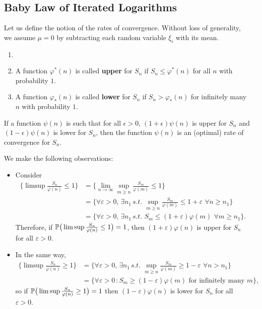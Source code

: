 \subsection{Baby Law of Iterated Logarithms}
Let us define the notion of the rates of convergence. Without loss of generality, we assume $\mu = 0$ by subtracting each random variable $\xi_i$ with its mean.
\begin{definition}
\begin{enumerate}
    \item[]
    \item A function $\varphi^*(n)$ is called \textbf{upper} for $S_n$ if $S_n \le \varphi^*(n)$ for all $n$ with probability $1$.
    \item A function $\varphi_*(n)$ is called \textbf{lower} for $S_n$ if $S_n > \varphi_*(n)$ for infinitely many $n$ with probability $1$.
\end{enumerate}

If a function $\psi(n)$ is such that for all $\epsilon > 0$, $(1+\epsilon)\psi(n)$ is upper for $S_n$ and $(1-\epsilon)\psi(n)$ is lower for $S_n$, then the function $\psi(n)$ is an (optimal) rate of convergence for $S_n$.
\end{definition}

We make the following observations:
\begin{itemize}
\item Consider
\begin{align*}
    \bigg\{ \limsup \frac{S_n}{\varphi(n)} \le 1 \bigg\}
    &= \bigg\{ \lim_{n \to \infty} \sup_{m \ge n} \frac{S_m}{\varphi(m)} \le 1\bigg\}\\
    &= \bigg\{ \forall \varepsilon > 0, \, \exists n_1 \, s.t. \, \, \sup_{m \ge n} \frac{S_m}{\varphi(m)} \le 1 + \varepsilon \, \, \forall n \ge n_1 \bigg\}\\
    &= \bigg\{ \forall \varepsilon > 0, \, \exists n_1 \, s.t. \,\, S_m \le (1 + \varepsilon) \varphi(m) \, \, \forall m \ge n_1 \bigg\}.
\end{align*}
Therefore, if $\mathbb{P} \big(\limsup \frac{S_n}{\varphi(n)} \le 1\big) = 1$, then $(1 + \varepsilon) \varphi(n)$ is upper for $S_n$ for all $\varepsilon > 0$.
\item In the same way,
\begin{align*}
    \bigg \{ \limsup \frac{S_n}{\varphi(n)} \ge 1 \bigg\}
    &= \bigg\{ \forall \varepsilon > 0, \, \exists n_1 \, s.t. \, \, \sup_{m \ge n}\frac{S_m}{\varphi(m)} \ge 1 - \varepsilon \, \, \forall n > n_1 \bigg\}\\
    &= \bigg\{ \forall \varepsilon > 0 \, : S_m \ge (1 - \varepsilon) \varphi(m) \, \, \text{for infinitely many }m \bigg\},
\end{align*}
so if $\mathbb{P}\big( \limsup \frac{S_n}{\varphi(n)} \ge 1 \big) = 1$ then $(1 - \varepsilon)\varphi(n)$ is lower for $S_n$ for all $\varepsilon > 0$.
\end{itemize}

